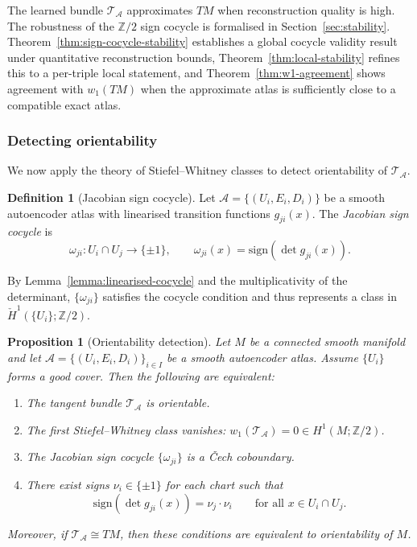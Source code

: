 \documentclass[11pt]{article}
\newcommand{\Z}{\mathbb{Z}}
\theoremstyle{plain}
\newtheorem{proposition}[theorem]{Proposition}
\theoremstyle{definition}
\newtheorem{definition}[theorem]{Definition}
\theoremstyle{remark}
\begin{document}
The learned bundle $\mathcal{T}_{\mathcal{A}}$ approximates $TM$ when reconstruction quality is high. The robustness of the $\mathbb{Z}/2$ sign cocycle is formalised in Section~\ref{sec:stability}. Theorem~\ref{thm:sign-cocycle-stability} establishes a global cocycle validity result under quantitative reconstruction bounds, Theorem~\ref{thm:local-stability} refines this to a per-triple local statement, and Theorem~\ref{thm:w1-agreement} shows agreement with $w_1(TM)$ when the approximate atlas is sufficiently close to a compatible exact atlas.

\subsubsection{Detecting orientability}

We now apply the theory of Stiefel--Whitney classes to detect orientability of $\mathcal{T}_{\mathcal{A}}$.

\begin{definition}[Jacobian sign cocycle]
Let $\mathcal{A} = \{(U_i, E_i, D_i)\}$ be a smooth autoencoder atlas with linearised transition functions $g_{ji}(x)$. The \emph{Jacobian sign cocycle} is
\[
\omega_{ji} \colon U_i \cap U_j \to \{\pm 1\}, \qquad \omega_{ji}(x) = \mathrm{sign}(\det g_{ji}(x)).
\]
\end{definition}

By Lemma~\ref{lemma:linearised-cocycle} and the multiplicativity of the determinant, $\{\omega_{ji}\}$ satisfies the cocycle condition and thus represents a class in $\check{H}^1(\{U_i\}; \Z/2)$.

\begin{proposition}[Orientability detection]\label{prop:main-orientability}
Let $M$ be a connected smooth manifold and let $\mathcal{A} = \{(U_i, E_i, D_i)\}_{i \in I}$ be a smooth autoencoder atlas. Assume $\{U_i\}$ forms a good cover. Then the following are equivalent:
\begin{enumerate}
\item The tangent bundle $\mathcal{T}_{\mathcal{A}}$ is orientable.
\item The first Stiefel--Whitney class vanishes: $w_1(\mathcal{T}_{\mathcal{A}}) = 0 \in H^1(M; \mathbb{Z}/2)$.
\item The Jacobian sign cocycle $\{\omega_{ji}\}$ is a \v{C}ech coboundary.
\item There exist signs $\nu_i \in \{\pm 1\}$ for each chart such that
\[
\mathrm{sign}(\det g_{ji}(x)) = \nu_j \cdot \nu_i \qquad \text{for all } x \in U_i \cap U_j.
\]
\end{enumerate}
Moreover, if $\mathcal{T}_{\mathcal{A}} \cong TM$, then these conditions are equivalent to orientability of $M$.
\end{proposition}
\end{document}
